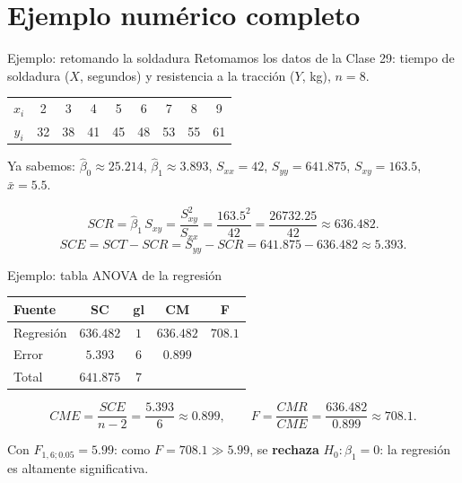 \documentclass[aspectratio=169,11pt]{beamer}
\begin{document}
\section{Ejemplo numérico completo}

\begin{frame}{Ejemplo: retomando la soldadura}
Retomamos los datos de la Clase 29: tiempo de soldadura ($X$, segundos) y resistencia a la tracción ($Y$, kg), $n=8$.

\begin{table}[htbp]
\centering
\begin{tabular}{c|cccccccc}
\toprule
$x_i$ & 2 & 3 & 4 & 5 & 6 & 7 & 8 & 9 \\
$y_i$ & 32 & 38 & 41 & 45 & 48 & 53 & 55 & 61 \\
\bottomrule
\end{tabular}
\end{table}

Ya sabemos: $\hat\beta_0\approx 25.214$, $\hat\beta_1\approx 3.893$, $S_{xx}=42$, $S_{yy}=641.875$, $S_{xy}=163.5$, $\bar x=5.5$.

\[
SCR = \hat\beta_1\, S_{xy} = \frac{S_{xy}^2}{S_{xx}} = \frac{163.5^2}{42} = \frac{26732.25}{42} \approx 636.482.
\]
\[
SCE = SCT - SCR = S_{yy} - SCR = 641.875 - 636.482 \approx 5.393.
\]
\end{frame}

\begin{frame}{Ejemplo: tabla ANOVA de la regresión}
\begin{table}[htbp]
\centering
\begin{tabular}{lcccc}
\toprule
Fuente & SC & gl & CM & F \\
\midrule
Regresión & $636.482$ & $1$ & $636.482$ & $708.1$ \\
Error & $5.393$ & $6$ & $0.899$ & \\
\midrule
Total & $641.875$ & $7$ & & \\
\bottomrule
\end{tabular}
\end{table}

\[
CME = \frac{SCE}{n-2} = \frac{5.393}{6} \approx 0.899, \qquad F = \frac{CMR}{CME} = \frac{636.482}{0.899} \approx 708.1.
\]

Con $F_{1,6;0.05}=5.99$: como $F=708.1 \gg 5.99$, se \textbf{rechaza} $H_0:\beta_1=0$: la regresión es altamente significativa.
\end{frame}
\end{document}
